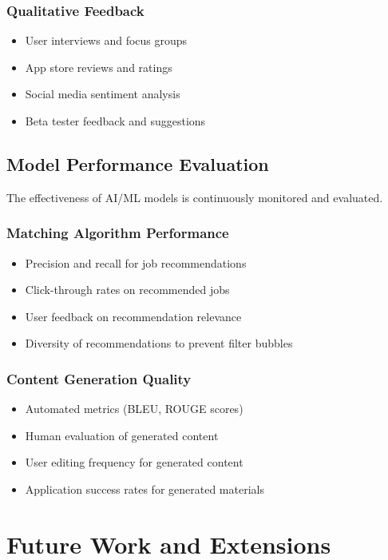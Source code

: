 \documentclass[12pt,a4paper]{report}
\begin{document}
\subsection{Qualitative Feedback}
\begin{itemize}[leftmargin=2em]
  \item User interviews and focus groups
  \item App store reviews and ratings
  \item Social media sentiment analysis
  \item Beta tester feedback and suggestions
\end{itemize}

\section{Model Performance Evaluation}
The effectiveness of AI/ML models is continuously monitored and evaluated.

\subsection{Matching Algorithm Performance}
\begin{itemize}[leftmargin=2em]
  \item Precision and recall for job recommendations
  \item Click-through rates on recommended jobs
  \item User feedback on recommendation relevance
  \item Diversity of recommendations to prevent filter bubbles
\end{itemize}

\subsection{Content Generation Quality}
\begin{itemize}[leftmargin=2em]
  \item Automated metrics (BLEU, ROUGE scores)
  \item Human evaluation of generated content
  \item User editing frequency for generated content
  \item Application success rates for generated materials
\end{itemize}

\chapter{Future Work and Extensions}
\end{document}
